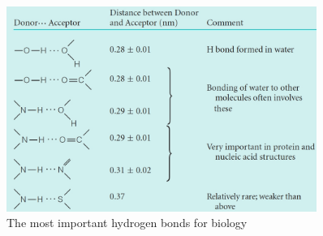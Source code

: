 \documentclass[]{article}
\begin{document}
\begin{figure}[H]
	\caption{The most important hydrogen bonds for biology} \label{fig:MajorHydrogenBonds} 
	\includegraphics[width=0.9\textwidth]{MajorHydrogenBonds}
\end{figure}
\end{document}

